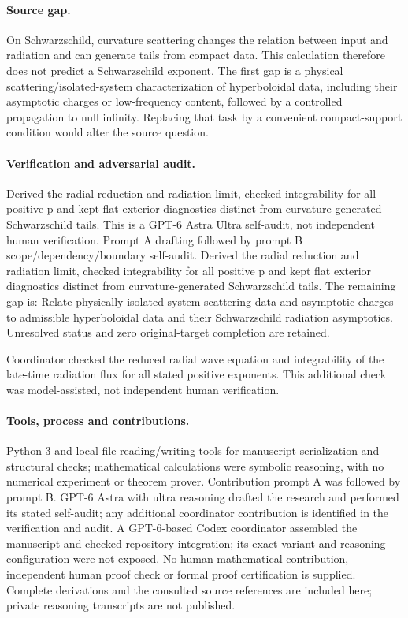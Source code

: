 \documentclass[11pt]{article}
\begin{document}
\paragraph{Source gap.} On Schwarzschild, curvature scattering changes the relation between input and radiation and can generate tails from compact data. This calculation therefore does not predict a Schwarzschild exponent. The first gap is a physical scattering/isolated-system characterization of hyperboloidal data, including their asymptotic charges or low-frequency content, followed by a controlled propagation to null infinity. Replacing that task by a convenient compact-support condition would alter the source question.

\paragraph{Verification and adversarial audit.}
Derived the radial reduction and radiation limit, checked integrability for all positive p and kept flat exterior diagnostics distinct from curvature-generated Schwarzschild tails. This is a GPT-6 Astra Ultra self-audit, not independent human verification. Prompt A drafting followed by prompt B scope/dependency/boundary self-audit. Derived the radial reduction and radiation limit, checked integrability for all positive p and kept flat exterior diagnostics distinct from curvature-generated Schwarzschild tails. The remaining gap is: Relate physically isolated-system scattering data and asymptotic charges to admissible hyperboloidal data and their Schwarzschild radiation asymptotics. Unresolved status and zero original-target completion are retained.

Coordinator checked the reduced radial wave equation and integrability of the late-time radiation flux for all stated positive exponents. This additional check was model-assisted, not independent human verification.

\paragraph{Tools, process and contributions.}
Python 3 and local file-reading/writing tools for manuscript serialization and structural checks; mathematical calculations were symbolic reasoning, with no numerical experiment or theorem prover. Contribution prompt A was followed by prompt B. GPT-6 Astra with ultra reasoning drafted the research and performed its stated self-audit; any additional coordinator contribution is identified in the verification and audit. A GPT-6-based Codex coordinator assembled the manuscript and checked repository integration; its exact variant and reasoning configuration were not exposed. No human mathematical contribution, independent human proof check or formal proof certification is supplied. Complete derivations and the consulted source references are included here; private reasoning transcripts are not published.
\end{document}
